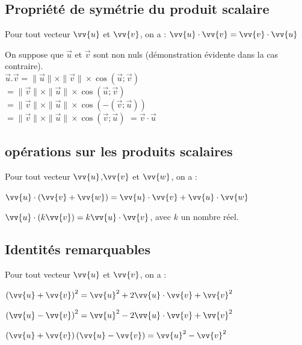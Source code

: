     \subsection{Propriété de symétrie du produit scalaire}
    
    \begin{bprop}
        Pour tout vecteur $\vv{u}$ et $\vv{v}$, on a : $\vv{u}\cdot \vv{v}= \vv{v}\cdot \vv{u}$ 
    \end{bprop}
    
    \begin{bdemo}
        On suppose que $\vec{u}$ et $\vec{v}$ sont non nuls (démonstration évidente dans la cas contraire).\\
        $\vec{u} . \vec{v}=\|\vec{u}\| \times\|\vec{v}\| \times \cos (\vec{u} ; \vec{v})$\\
        $=\|\vec{v}\| \times\|\vec{u}\| \times \cos (\vec{u} ; \vec{v})$\\
        $=\|\vec{v}\| \times\|\vec{u}\| \times \cos (-(\vec{v} ; \vec{u}))$\\
        $=\|\vec{v}\| \times\|\vec{u}\| \times \cos (\vec{v} ; \vec{u})$
        $=\vec{v} \cdot \vec{u}$\\
    \end{bdemo}
    
    \subsection{opérations sur les produits scalaires}
    
    \begin{bprop}
        Pour tout vecteur $\vv{u}$,$\vv{v}$ et $\vv{w}$, on a :
        \begin{enumProp}
            \item $\vv{u} \cdot (\vv{v}+\vv{w})=\vv{u} \cdot \vv{v}+\vv{u} \cdot \vv{w}$
            \item $\vv{u} \cdot (k \vv{v})=k \vv{u} \cdot \vv{v}$, avec $k$ un nombre réel.
        \end{enumProp}
    \end{bprop}

    \subsection{Identités remarquables}
    
    \begin{bprop}
        Pour tout vecteur $\vv{u}$ et $\vv{v}$, on a :
        \begin{enumProp}
            \item $\left(\vv{u}+\vv{v}\right)^2=\vv{u}^2 +2\vv{u} \cdot \vv{v}+\vv{v}^2$
            \item $\left(\vv{u}-\vv{v}\right)^2=\vv{u}^2 -2\vv{u} \cdot \vv{v}+\vv{v}^2$
            \item $\left(\vv{u}+\vv{v}\right)\left(\vv{u}-\vv{v}\right)=\vv{u}^2-\vv{v}^2$
        \end{enumProp}
    \end{bprop}
    
